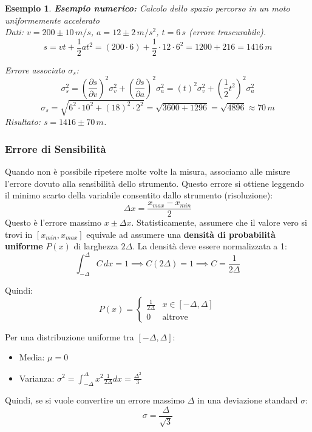 \documentclass[openany,a4paper,12pt]{book}
\newtheorem*{example}{Esempio}
\theoremstyle{remark}
\begin{document}
\begin{example}
\textbf{Esempio numerico:} Calcolo dello spazio percorso in un moto uniformemente accelerato \\
Dati: $v = 200 \pm 10 \, m/s$, \quad $a = 12 \pm 2 \, m/s^2$, \quad $t = 6 \, s$ (errore trascurabile).
\[ s =  vt + \frac{1}{2}at^2 = (200 \cdot 6) + \frac{1}{2} \cdot 12 \cdot 6^2 = 1200 + 216 = 1416 \, m \]

Errore associato $\sigma_s$:
\[ \sigma_s^2 = \left( \frac{\partial s}{\partial v} \right)^2 \sigma_v^2 + \left( \frac{\partial s}{\partial a} \right)^2 \sigma_a^2 = (t)^2 \sigma_v^2 + \left(\frac{1}{2}t^2\right)^2 \sigma_a^2 \]
\[ \sigma_s = \sqrt{ 6^2 \cdot 10^2 + (18)^2 \cdot 2^2 } = \sqrt{3600 + 1296} = \sqrt{4896} \approx 70 \, m \]
Risultato: $s = 1416 \pm 70 \, m$.

\end{example}




\subsubsection{Errore di Sensibilità}
Quando non è possibile ripetere molte volte la misura, associamo alle misure l'errore dovuto alla sensibilità dello strumento. Questo errore si ottiene leggendo il minimo scarto della variabile consentito dallo strumento (risoluzione):
\[ \Delta x = \frac{x_{max} - x_{min}}{2} \]
Questo è l'errore massimo $x \pm \Delta x$. Statisticamente, assumere che il valore vero si trovi in $[x_{min}, x_{max}]$ equivale ad assumere una \textbf{densità di probabilità uniforme} $P(x)$ di larghezza $2\Delta$.
La densità deve essere normalizzata a 1:
\[ \int_{-\Delta}^{\Delta} C \, dx = 1 \implies C(2\Delta) = 1 \implies C = \frac{1}{2\Delta} \]

Quindi:
\[ P(x) = \begin{cases} \frac{1}{2\Delta} & x \in [-\Delta, \Delta] \\ 0 & \text{altrove} \end{cases} \]

Per una distribuzione uniforme tra $[-\Delta, \Delta]$:
\begin{itemize}
    \item Media: $\mu = 0$
    \item Varianza: $\sigma^2 = \int_{-\Delta}^{\Delta} x^2 \frac{1}{2\Delta} dx = \frac{\Delta^2}{3}$
\end{itemize}
Quindi, se si vuole convertire un errore massimo $\Delta$ in una deviazione standard $\sigma$:
\begin{equation}
    \sigma = \frac{\Delta}{\sqrt{3}}
\end{equation}
\end{document}
